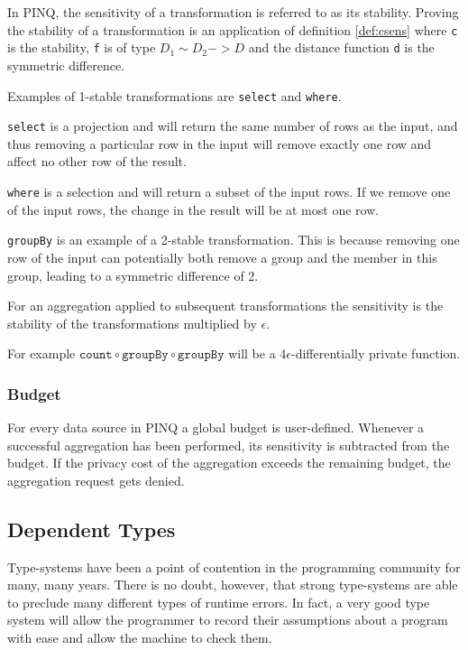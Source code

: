 \documentclass[12pt]{article}
\begin{document}
In PINQ, the sensitivity of a transformation is referred to as its stability. Proving the stability of a transformation is an application of definition \ref{def:csens} where \texttt{c} is the stability, \texttt{f} is of type  $D_1 \sim D_2 -> D$ and the distance function \texttt{d} is the symmetric difference.

Examples of 1-stable transformations are \texttt{select} and \texttt{where}. 

\texttt{select} is a projection and will return the same number of rows as the input, and thus removing a particular row in the input will remove exactly one row and affect no other row of the result.

\texttt{where} is a selection and will return a subset of the input rows. If we remove one of the input rows, the change in the result will be at most one row.

\texttt{groupBy} is an example of a 2-stable transformation. This is because removing one row of the input can potentially both remove a group and the member in this group, leading to a symmetric difference of 2.

For an aggregation applied to subsequent transformations the sensitivity is the stability of the transformations multiplied by $\epsilon$.

For example $\texttt{count} \circ \texttt{groupBy} \circ \texttt{groupBy}$ will be a $4\epsilon$-differentially private function.

\subsubsection{Budget}

For every data source in PINQ a global budget is user-defined. Whenever a successful aggregation has been performed, its sensitivity is subtracted from the budget.
If the privacy cost of the aggregation exceeds the remaining budget, the aggregation request gets denied.


\subsection{Dependent Types}

Type-systems have been a point of contention in the programming community for many, many years.
There is no doubt, however, that strong type-systems are able to preclude many different types of runtime errors.
In fact, a very good type system will allow the programmer to record their assumptions about a program with ease and allow the machine to check them.
\end{document}
